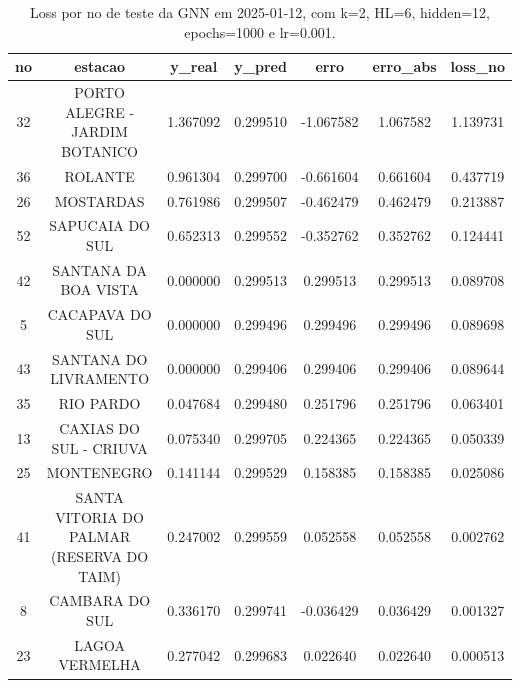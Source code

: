 \begin{table}[h]
\centering
\caption{Loss por no de teste da GNN em 2025-01-12, com k=2, HL=6, hidden=12, epochs=1000 e lr=0.001.}
\label{tab:gnn_loss_k2_hl6_h12_e1000_d20250112}
\begin{tabular}{ccccccc}
\toprule
no & estacao & y\_real & y\_pred & erro & erro\_abs & loss\_no \\
\midrule
32 & PORTO ALEGRE - JARDIM BOTANICO & 1.367092 & 0.299510 & -1.067582 & 1.067582 & 1.139731 \\
36 & ROLANTE & 0.961304 & 0.299700 & -0.661604 & 0.661604 & 0.437719 \\
26 & MOSTARDAS & 0.761986 & 0.299507 & -0.462479 & 0.462479 & 0.213887 \\
52 & SAPUCAIA DO SUL & 0.652313 & 0.299552 & -0.352762 & 0.352762 & 0.124441 \\
42 & SANTANA DA BOA VISTA & 0.000000 & 0.299513 & 0.299513 & 0.299513 & 0.089708 \\
5 & CACAPAVA DO SUL & 0.000000 & 0.299496 & 0.299496 & 0.299496 & 0.089698 \\
43 & SANTANA DO LIVRAMENTO & 0.000000 & 0.299406 & 0.299406 & 0.299406 & 0.089644 \\
35 & RIO PARDO & 0.047684 & 0.299480 & 0.251796 & 0.251796 & 0.063401 \\
13 & CAXIAS DO SUL - CRIUVA & 0.075340 & 0.299705 & 0.224365 & 0.224365 & 0.050339 \\
25 & MONTENEGRO & 0.141144 & 0.299529 & 0.158385 & 0.158385 & 0.025086 \\
41 & SANTA VITORIA DO PALMAR (RESERVA DO TAIM) & 0.247002 & 0.299559 & 0.052558 & 0.052558 & 0.002762 \\
8 & CAMBARA DO SUL & 0.336170 & 0.299741 & -0.036429 & 0.036429 & 0.001327 \\
23 & LAGOA VERMELHA & 0.277042 & 0.299683 & 0.022640 & 0.022640 & 0.000513 \\
\bottomrule
\end{tabular}
\end{table}
